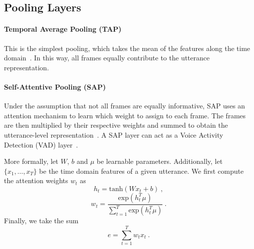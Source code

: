 \documentclass[conference]{IEEEtran}
\begin{document}

\subsection{Pooling Layers}

\paragraph{Temporal Average Pooling (TAP)}This is the simplest pooling, which takes the mean of the features along the time domain~\cite{cai2018exploring,chung2019delving}. In this way, all frames equally contribute to the utterance representation.

\paragraph{Self-Attentive Pooling (SAP)}Under the assumption that not all frames are equally informative, SAP uses an attention mechanism to learn which weight to assign to each frame. The frames are then multiplied by their respective weights and summed to obtain the utterance-level representation~\cite{cai2018exploring}. A SAP layer can act as a Voice Activity Detection (VAD) layer~\cite{desplanques2020ecapa}.

More formally, let $W$, $b$ and $\mu$ be learnable parameters. Additionally, let $\{x_1,\dots,x_T\}$ be the time domain features of a given utterance. We first compute the attention weights $w_t$ as
\begin{equation}
    h_t = \text{tanh}(Wx_t + b)~,
\end{equation}
\begin{equation}
    w_t = \frac{\text{exp}(h_t^T\mu)}{\sum_{t=1}^T\text{exp}(h_t^T\mu)}~.
\end{equation}
Finally, we take the sum
\begin{equation}
    e = \sum_{t=1}^Tw_tx_t~.
\end{equation}
\end{document}
